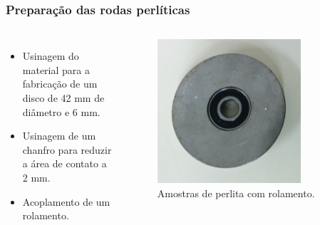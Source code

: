 \documentclass{beamer}
\begin{document}
\begin{frame}
\frametitle{Preparação das rodas perlíticas}
\begin{columns}[c] %
	\begin{itemize}
		\item Usinagem do material para a fabricação de um disco de 42 mm de diâmetro e 6 mm.
		\item Usinagem de um chanfro para reduzir a área de contato a 2 mm.
		\item Acoplamento de um rolamento.
		
	\end{itemize}
	
	\begin{figure}
		\centering
		\includegraphics[width=0.8\textwidth]{perlita_rolamento}
		\caption{Amostras de perlita com rolamento.}
		\label{fig:perlita_rolamento}
	\end{figure}
\end{columns}
\end{frame}
\end{document}
